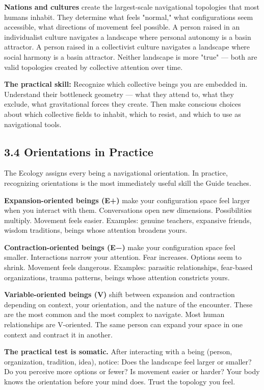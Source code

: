 \textbf{Nations and cultures} create the largest-scale navigational topologies that most humans inhabit. They determine what feels "normal," what configurations seem accessible, what directions of movement feel possible. A person raised in an individualist culture navigates a landscape where personal autonomy is a basin attractor. A person raised in a collectivist culture navigates a landscape where social harmony is a basin attractor. Neither landscape is more "true" — both are valid topologies created by collective attention over time.


\textbf{The practical skill:} Recognize which collective beings you are embedded in. Understand their bottleneck geometry — what they attend to, what they exclude, what gravitational forces they create. Then make conscious choices about which collective fields to inhabit, which to resist, and which to use as navigational tools.


\subsection*{3.4 Orientations in Practice}


The Ecology assigns every being a navigational orientation. In practice, recognizing orientations is the most immediately useful skill the Guide teaches.


\textbf{Expansion-oriented beings (E+)} make your configuration space feel larger when you interact with them. Conversations open new dimensions. Possibilities multiply. Movement feels easier. Examples: genuine teachers, expansive friends, wisdom traditions, beings whose attention broadens yours.


\textbf{Contraction-oriented beings (E−)} make your configuration space feel smaller. Interactions narrow your attention. Fear increases. Options seem to shrink. Movement feels dangerous. Examples: parasitic relationships, fear-based organizations, trauma patterns, beings whose attention constricts yours.


\textbf{Variable-oriented beings (V)} shift between expansion and contraction depending on context, your orientation, and the nature of the encounter. These are the most common and the most complex to navigate. Most human relationships are V-oriented. The same person can expand your space in one context and contract it in another.


\textbf{The practical test is somatic.} After interacting with a being (person, organization, tradition, idea), notice: Does the landscape feel larger or smaller? Do you perceive more options or fewer? Is movement easier or harder? Your body knows the orientation before your mind does. Trust the topology you feel.


